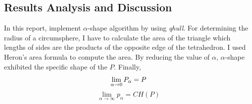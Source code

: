 \documentclass[11pt]{article}
\begin{document}
\subsection{Results Analysis and Discussion}
In this report, implement $\alpha$-shape algorithm by using \textit{qhull}. For determining the radius of a circumsphere, I have to calculate the area of the triangle which lengths of sides are the products of the opposite edge of the tetrahedron. I used Heron's area formula to compute the area. By reducing the value of $\alpha$, $\alpha$-shape exhibited the specific shape of the $P$. Finally,
\begin{equation*}
\lim_{\alpha \to 0}P_\alpha = P\\
\end{equation*}
\begin{equation*}
\lim_{\alpha \to \infty}p_\alpha = CH(P)
\end{equation*}
\end{document}
